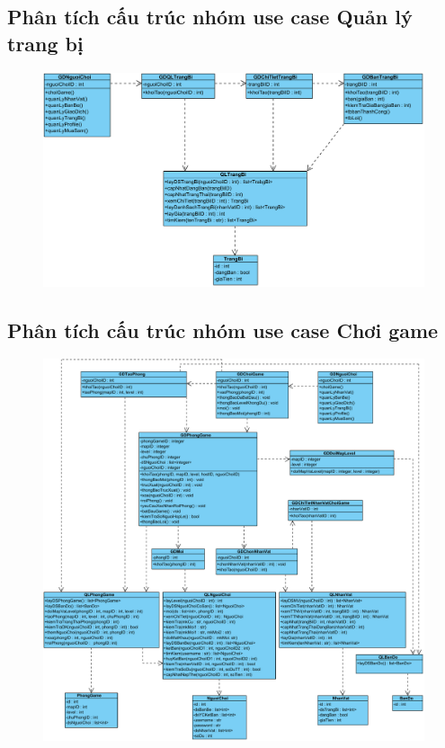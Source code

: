 \documentclass[3p]{elsarticle}
\begin{document}
\subsection{Phân tích cấu trúc nhóm use case Quản lý trang bị}
\begin{figure}[!htbp]
	\hspace*{-.5in}
	\centering
	\includegraphics[scale=.55]{images/structure-pdfs/gamer/ItemManagement.pdf}
\end{figure}
\newpage
\subsection{Phân tích cấu trúc nhóm use case Chơi game}
\begin{figure}[!htbp]
	\hspace*{-.5in}
	\centering
	\includegraphics[scale=.55]{images/structure-pdfs/gamer/PlayGame.pdf}
\end{figure}
\newpage
\end{document}
